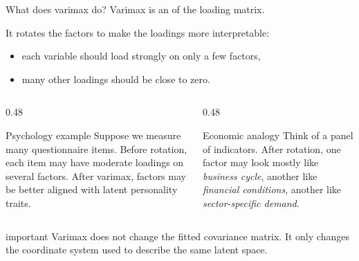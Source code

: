 \documentclass[dvipsnames,aspectratio=169,handout]{beamer}
\begin{document}
\begin{frame}{What does varimax do?}
Varimax is an  of the loading matrix.

\begin{block}{}
It rotates the factors to make the loadings more interpretable:
\begin{itemize}
    \item each variable should load strongly on only a few factors,
    \item many other loadings should be close to zero.
\end{itemize}
\end{block}
\begin{columns}[T]
\begin{column}{0.48\textwidth}
\begin{exampleblock}{Psychology example}
Suppose we measure many questionnaire items.
Before rotation, each item may have moderate loadings on several factors.
After varimax, factors may be better aligned with latent personality traits.
\end{exampleblock}
\end{column}
\begin{column}{0.48\textwidth}
\begin{exampleblock}{Economic analogy}
Think of a panel of indicators.
After rotation, one factor may look mostly like \emph{business cycle},
another like \emph{financial conditions},
another like \emph{sector-specific demand}.
\end{exampleblock}
\end{column}
\end{columns}

\begin{beamercolorbox}[wd=\textwidth,sep=7pt,center,rounded=true,shadow=true]{important}
Varimax does not change the fitted covariance matrix.
It only changes the coordinate system used to describe the same latent space.
\end{beamercolorbox}
\end{frame}
\end{document}
